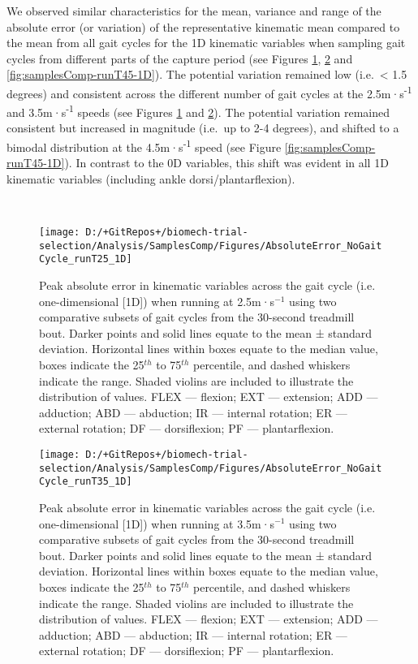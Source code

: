 \documentclass[]{elsarticle} %
\begin{document}
We observed similar characteristics for the mean, variance and range of
the absolute error (or variation) of the representative kinematic mean
compared to the mean from all gait cycles for the 1D kinematic variables
when sampling gait cycles from different parts of the capture period
(see Figures \ref{fig:samplesComp-runT25-1D},
\ref{fig:samplesComp-runT35-1D} and \ref{fig:samplesComp-runT45-1D}).
The potential variation remained low (i.e.~\textless{} 1.5 degrees) and
consistent across the different number of gait cycles at the
2.5m·s\textsuperscript{-1} and 3.5m·s\textsuperscript{-1} speeds (see
Figures \ref{fig:samplesComp-runT25-1D} and
\ref{fig:samplesComp-runT35-1D}). The potential variation remained
consistent but increased in magnitude (i.e.~up to 2-4 degrees), and
shifted to a bimodal distribution at the 4.5m·s\textsuperscript{-1}
speed (see Figure \ref{fig:samplesComp-runT45-1D}). In contrast to the
0D variables, this shift was evident in all 1D kinematic variables
(including ankle dorsi/plantarflexion).

~

\begin{figure}

{\centering \texttt{[image: D:/+GitRepos+/biomech-trial-selection/Analysis/SamplesComp/Figures/AbsoluteError\_NoGaitCycle\_runT25\_1D]} 

}

\caption{Peak absolute error in kinematic variables across the gait cycle (i.e. one-dimensional [1D]) when running at 2.5m·s$^{-1}$ using two comparative subsets of gait cycles from the 30-second treadmill bout. Darker points and solid lines equate to the mean ± standard deviation. Horizontal lines within boxes equate to the median value, boxes indicate the 25$^{th}$ to 75$^{th}$ percentile, and dashed whiskers indicate the range. Shaded violins are included to illustrate the distribution of values. FLEX — flexion; EXT — extension; ADD — adduction; ABD — abduction; IR — internal rotation; ER — external rotation; DF — dorsiflexion; PF — plantarflexion.}\label{fig:samplesComp-runT25-1D}
\end{figure}

\begin{figure}

{\centering \texttt{[image: D:/+GitRepos+/biomech-trial-selection/Analysis/SamplesComp/Figures/AbsoluteError\_NoGaitCycle\_runT35\_1D]} 

}

\caption{Peak absolute error in kinematic variables across the gait cycle (i.e. one-dimensional [1D]) when running at 3.5m·s$^{-1}$ using two comparative subsets of gait cycles from the 30-second treadmill bout. Darker points and solid lines equate to the mean ± standard deviation. Horizontal lines within boxes equate to the median value, boxes indicate the 25$^{th}$ to 75$^{th}$ percentile, and dashed whiskers indicate the range. Shaded violins are included to illustrate the distribution of values. FLEX — flexion; EXT — extension; ADD — adduction; ABD — abduction; IR — internal rotation; ER — external rotation; DF — dorsiflexion; PF — plantarflexion.}\label{fig:samplesComp-runT35-1D}
\end{figure}
\end{document}
